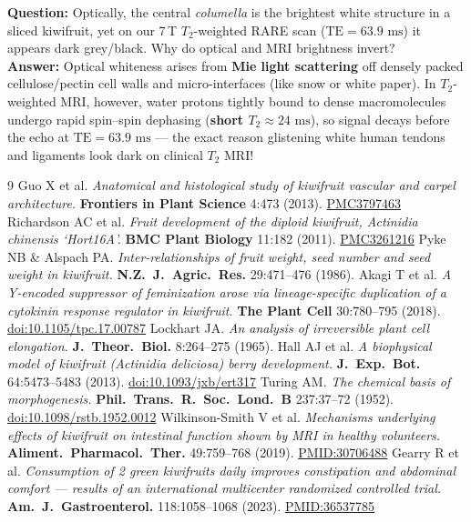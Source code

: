 \documentclass[10.5pt,a4paper]{article}
\begin{document}
\begin{qabox}
\textbf{Question:} Optically, the central \emph{columella} is the brightest white structure in a sliced kiwifruit, yet on our 7\,T $T_2$-weighted RARE scan ($\text{TE}=63.9\text{ ms}$) it appears dark grey/black. Why do optical and MRI brightness invert?\\[2pt]
\textbf{Answer:} Optical whiteness arises from \textbf{Mie light scattering} off densely packed cellulose/pectin cell walls and micro-interfaces (like snow or white paper). In $T_2$-weighted MRI, however, water protons tightly bound to dense macromolecules undergo rapid spin--spin dephasing (\textbf{short $T_2 \approx 24\text{ ms}$}), so signal decays before the echo at $\text{TE}=63.9\text{ ms}$ --- the exact reason glistening white human tendons and ligaments look dark on clinical $T_2$ MRI!
\end{qabox}

\begin{thebibliography}{9}
\scriptsize
\setlength{\itemsep}{1.5pt}
     Guo X et al. \emph{Anatomical and histological study of kiwifruit vascular and carpel architecture.} \textbf{Frontiers in Plant Science} 4:473 (2013). \href{https://pmc.ncbi.nlm.nih.gov/articles/PMC3797463/}{PMC3797463}
     Richardson AC et al. \emph{Fruit development of the diploid kiwifruit, Actinidia chinensis `Hort16A'.} \textbf{BMC Plant Biology} 11:182 (2011). \href{https://pmc.ncbi.nlm.nih.gov/articles/PMC3261216/}{PMC3261216}
     Pyke NB \& Alspach PA. \emph{Inter-relationships of fruit weight, seed number and seed weight in kiwifruit.} \textbf{N.Z.\ J.\ Agric.\ Res.} 29:471--476 (1986).
     Akagi T et al. \emph{A Y-encoded suppressor of feminization arose via lineage-specific duplication of a cytokinin response regulator in kiwifruit.} \textbf{The Plant Cell} 30:780--795 (2018). \href{https://doi.org/10.1105/tpc.17.00787}{doi:10.1105/tpc.17.00787}
     Lockhart JA. \emph{An analysis of irreversible plant cell elongation.} \textbf{J.\ Theor.\ Biol.} 8:264--275 (1965).
     Hall AJ et al. \emph{A biophysical model of kiwifruit (Actinidia deliciosa) berry development.} \textbf{J.\ Exp.\ Bot.} 64:5473--5483 (2013). \href{https://doi.org/10.1093/jxb/ert317}{doi:10.1093/jxb/ert317}
     Turing AM. \emph{The chemical basis of morphogenesis.} \textbf{Phil.\ Trans.\ R.\ Soc.\ Lond.\ B} 237:37--72 (1952). \href{https://doi.org/10.1098/rstb.1952.0012}{doi:10.1098/rstb.1952.0012}
     Wilkinson-Smith V et al. \emph{Mechanisms underlying effects of kiwifruit on intestinal function shown by MRI in healthy volunteers.} \textbf{Aliment.\ Pharmacol.\ Ther.} 49:759--768 (2019). \href{https://pubmed.ncbi.nlm.nih.gov/30706488/}{PMID:30706488}
     Gearry R et al. \emph{Consumption of 2 green kiwifruits daily improves constipation and abdominal comfort --- results of an international multicenter randomized controlled trial.} \textbf{Am.\ J.\ Gastroenterol.} 118:1058--1068 (2023). \href{https://pubmed.ncbi.nlm.nih.gov/36537785/}{PMID:36537785}
\end{thebibliography}
\end{document}
